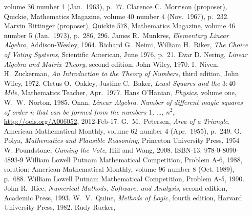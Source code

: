 \begin{thebibliography}{\makebox[2em][c]{{}\hfil{}}}
  volume 36 number 1 (Jan.\ 1963),
  p.~77.
  Clarence C.\ Morrison (proposer),
  Quickie,
  Mathematics Magazine,
  volume 40 number 4 (Nov.\ 1967),
  p.~232.
  Marvin Bittinger (proposer),
  Quickie 578,
  Mathematics Magazine,
  volume 46 number 5 (Jan.\ 1973),
  p.~286, 296.
  James R.\ Munkres,
  \emph{Elementary Linear Algebra},
  Addison-Wesley,
  1964.
  Richard G.~Neimi, William H.~Riker,
  \emph{The Choice of Voting Systems},
  Scientific American,
  June 1976,
  p.~21.
  Evar D. Nering,
  \emph{Linear Algebra and Matrix Theory},
  second edition,
  John Wiley,
  1970.
  I.\ Niven, H.\ Zuckerman,
  \emph{An Introduction to the Theory of Numbers},
  third edition,
  John Wiley,
  1972.
  Cletus O.\ Oakley, Justine C.\ Baker,
  \emph{Least Squares and the $3:40$ Mile},
  Mathematics Teacher,
  Apr.\ 1977.
  Hans O'Hanian,
  \emph{Physics},
  volume one,
  W.\ W.\ Norton,
  1985.
  Onan,
  \emph{Linear Algebra}.
  \emph{Number of different magic squares of order n that can be formed from the numbers $1$, \ldots, $n^2$},
  \url{http://oeis.org/A006052},
  2012-Feb-17.
  G.\ M.\ Petersen,
  \emph{Area of a Triangle},
  American Mathematical Monthly,
  volume 62 number 4 (Apr.\ 1955),
  p.~249.
  G. Polya,
  \emph{Mathematics and Plausible Reasoning},
  Princeton University Press,
  1954
  W. Poundstone,
  \emph{Gaming the Vote},
  Hill and Wang, 2008.
  ISBN-13: 978-0-8090-4893-9 
  William Lowell Putnam Mathematical Competition,
  Problem A-6, 1988,
  solution: American Mathematical Monthly, 
  volume 96 number 8 (Oct. 1989),
  p.~688.
  William Lowell Putnam Mathematical Competition,
  Problem A-5, 1990.
  John R.\ Rice,
  \emph{Numerical Mathods, Software, and Analysis},
  second edition,
  Academic Press,
  1993.
  W.\ V.\ Quine,
  \emph{Methods of Logic},
  fourth edition,
  Harvard University Press,
  1982.
  Rudy Rucker,

\end{thebibliography}
